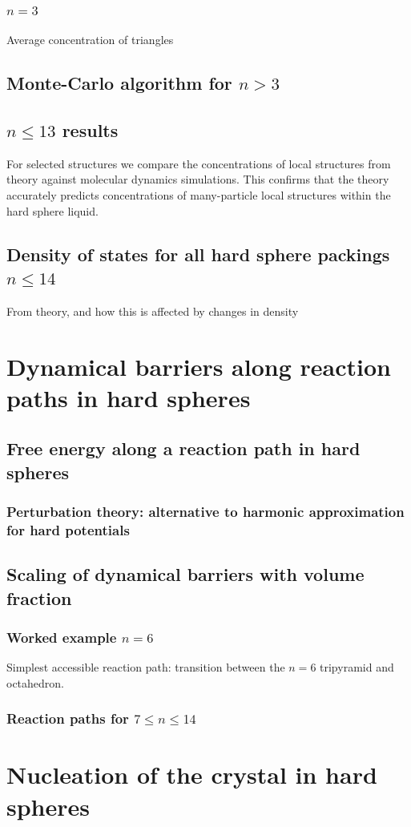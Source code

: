 \documentclass[12pt]{report}
\begin{document}
\subsubsection{$n = 3$}
Average concentration of triangles
\subsection{Monte-Carlo algorithm for $n > 3$}
\subsection{$n \le 13$ results}
For selected structures we compare the concentrations of local structures from theory against molecular dynamics simulations.
This confirms that the theory accurately predicts concentrations of many-particle local structures within the hard sphere liquid.
\subsection{Density of states for all hard sphere packings $n \le 14$}
From theory, and how this is affected by changes in density

\section{Dynamical barriers along reaction paths in hard spheres}
\subsection{Free energy along a reaction path in hard spheres}
\subsubsection{Perturbation theory: alternative to harmonic approximation for hard potentials}
\subsection{Scaling of dynamical barriers with volume fraction}
\subsubsection{Worked example $n = 6$}
Simplest accessible reaction path: transition between the $n = 6$ tripyramid and octahedron.
\subsubsection{Reaction paths for $7 \le n \le 14$}

\section{Nucleation of the crystal in hard spheres}
\end{document}
